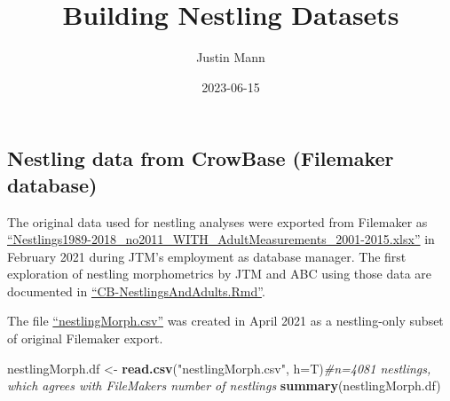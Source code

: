 \documentclass[
]{article}
\title{Building Nestling Datasets}
\author{Justin Mann}
\date{2023-06-15}
\newenvironment{Shaded}{\begin{snugshade}}{\end{snugshade}}
\newcommand{\AttributeTok}[1]{\textcolor[rgb]{0.13,0.29,0.53}{#1}}
\newcommand{\CommentTok}[1]{\textcolor[rgb]{0.56,0.35,0.01}{\textit{#1}}}
\newcommand{\FunctionTok}[1]{\textcolor[rgb]{0.13,0.29,0.53}{\textbf{#1}}}
\newcommand{\NormalTok}[1]{#1}
\newcommand{\OtherTok}[1]{\textcolor[rgb]{0.56,0.35,0.01}{#1}}
\newcommand{\StringTok}[1]{\textcolor[rgb]{0.31,0.60,0.02}{#1}}
\begin{document}
\maketitle

\hypertarget{nestling-data-from-crowbase-filemaker-database}{%
\subsection{Nestling data from CrowBase (Filemaker
database)}\label{nestling-data-from-crowbase-filemaker-database}}

The original data used for nestling analyses were exported from
Filemaker as
\href{https://github.com/justinthomasmann/CrowBase/blob/main/OldDocs/Nestlings1989-2018_no2011_WITH_AdultMeasurements_2001-2015.xlsx}{``Nestlings1989-2018\_no2011\_WITH\_AdultMeasurements\_2001-2015.xlsx''}
in February 2021 during JTM's employment as database manager. The first
exploration of nestling morphometrics by JTM and ABC using those data
are documented in
\href{https://github.com/justinthomasmann/CrowBase/blob/main/CB-NestlingsAndAdults.Rmd}{``CB-NestlingsAndAdults.Rmd''}.

The file
\href{https://github.com/justinthomasmann/CrowBase/blob/main/nestlingMorph.csv}{``nestlingMorph.csv''}
was created in April 2021 as a nestling-only subset of original
Filemaker export.

\begin{Shaded}
\begin{Highlighting}[]
\NormalTok{nestlingMorph.df }\OtherTok{\textless{}{-}} \FunctionTok{read.csv}\NormalTok{(}\StringTok{"nestlingMorph.csv"}\NormalTok{, }\AttributeTok{h=}\NormalTok{T)}\CommentTok{\#n=4081 nestlings, which agrees with FileMaker\textquotesingle{}s number of nestlings}
\FunctionTok{summary}\NormalTok{(nestlingMorph.df)}
\end{Highlighting}
\end{Shaded}
\end{document}
